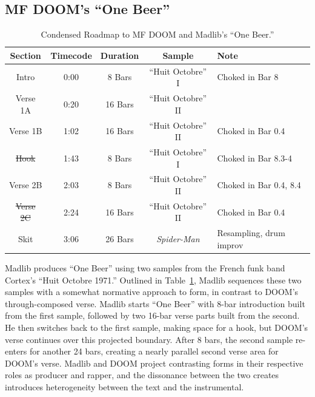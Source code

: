 \subsection*{\centering MF DOOM's ``One Beer''} 

    \begin{table}[ht]
        \centering
            \begin{tabular}{|c|c|c|c|l|}
                 \hline
                  Section         & Timecode & Duration & Sample              & Note                    \\ \hline
                  Intro           & 0:00     & 8 Bars   & ``Huit Octobre'' I  & Choked in Bar 8         \\ \hline
                  Verse 1A        & 0:20     & 16 Bars  & ``Huit Octobre'' II &                         \\ \hline
                  Verse 1B        & 1:02     & 16 Bars  & ``Huit Octobre'' II & Choked in Bar 0.4       \\ \hline
                  \sout{Hook}     & 1:43     & 8 Bars   & ``Huit Octobre'' I  & Choked in Bar 8.3-4     \\ \hline
                  Verse 2B        & 2:03     & 8 Bars   & ``Huit Octobre'' II & Choked in Bar 0.4, 8.4  \\ \hline
                  \sout{Verse 2C} & 2:24     & 16 Bars  & ``Huit Octobre'' II & Choked in Bar 0.4       \\ \hline
                  Skit            & 3:06     & 26 Bars  & \textit{Spider-Man} & Resampling, drum improv \\ \hline
             \end{tabular}
        \caption{Condensed Roadmap to MF DOOM and Madlib's ``One Beer.''}
        \label{tab:onebeer}
    \end{table}

Madlib produces ``One Beer'' using two samples from the French funk band Cortex's ``Huit Octobre 1971.'' Outlined in Table~\ref{tab:onebeer}, Madlib sequences these two samples with a somewhat normative approach to form, in contrast to DOOM's through-composed verse. Madlib starts ``One Beer'' with 8-bar introduction built from the first sample, followed by two 16-bar verse parts built from the second. He then switches back to the first sample, making space for a hook, but DOOM's verse continues over this projected boundary. After 8 bars, the second sample re-enters for another 24 bars, creating a nearly parallel second verse area for DOOM's verse. Madlib and DOOM project contrasting forms in their respective roles as producer and rapper, and the dissonance between the two creates introduces heterogeneity between the text and the instrumental.

